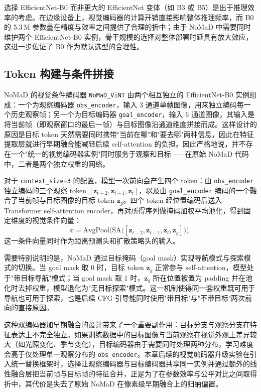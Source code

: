 选择 EfficientNet-B0 而非更大的 EfficientNet 变体（如 B3 或 B5）是出于推理效率的考虑。在边缘设备上，视觉编码器的计算开销直接影响整体推理频率，而 B0 的 5.3\,M 参数量在精度与效率之间提供了合理的折中；由于 NoMaD 中需要同时维护两个 EfficientNet-B0 实例，骨干规模的选择对整体部署时延具有放大效应，这进一步佐证了 B0 作为默认选型的合理性。

\subsection{Token 构建与条件拼接}

NoMaD 的视觉条件编码器 \texttt{NoMaD\_ViNT} 由两个相互独立的 EfficientNet-B0 实例组成：一个为观察编码器 \texttt{obs\_encoder}，输入 3 通道单帧图像，用来独立编码每一个历史观察帧；另一个为目标编码器 \texttt{goal\_encoder}，输入 6 通道图像，其输入是将当前帧（即观察窗口的最后一帧）与目标图像沿通道维度拼接而成。这样设计的原因是目标 token 天然需要同时携带"当前在哪"和"要去哪"两种信息，因此在特征提取层就进行早期融合能减轻后续 self-attention 的负担。因此严格地说，并不存在一个"统一的视觉编码器实例"同时服务于观察和目标——在原始 NoMaD 代码中，二者是两个独立权重的网络。

对于 \texttt{context\_size=3} 的配置，模型一次前向会产生四个 token：由 \texttt{obs\_encoder} 独立编码的三个观察 token $[\mathbf{z}_{t-2}, \mathbf{z}_{t-1}, \mathbf{z}_t]$，以及由 \texttt{goal\_encoder} 编码的一个融合了当前帧与目标图像的目标 token $\mathbf{z}_g$。四个 token 经位置编码后送入 Transformer self-attention encoder，再对所得序列做掩码加权平均池化，得到固定维度的视觉条件向量：
\begin{equation}
\mathbf{c} = \text{AvgPool}\bigl(\text{SA}\bigl([\mathbf{z}_{t-2}, \mathbf{z}_{t-1}, \mathbf{z}_t, \mathbf{z}_g]\bigr)\bigr).
\end{equation}
这一条件向量同时作为距离预测头和扩散策略头的输入。

需要特别说明的是，NoMaD 通过目标掩码（goal mask）实现导航模式与探索模式的切换。当 goal mask 取 0 时，目标 token $\mathbf{z}_g$ 正常参与 self-attention，模型处于"带目标导航"模式；当 goal mask 取 1 时，$\mathbf{z}_g$ 所在位置被置为 padding 并在池化时去掉权重，模型退化为"无目标探索"模式。这一机制使得同一套权重既可用于导航也可用于探索，也是后续 CFG 引导能同时使用"带目标"与"不带目标"两次前向的直接原因。

这种双编码器加早期融合的设计带来了一个重要副作用：目标分支与观察分支在特征表达上不完全独立。如果训练数据中的目标图像与当前观察在视觉外观上差异较大（如光照变化、季节变化），目标编码器由于需要同时处理两种分布，学习难度会高于仅处理单一观察分布的 \texttt{obs\_encoder}。本章后续的视觉编码器升级实验在引入统一替换框架时，选择让观察编码器与目标编码器共享同一实例并通过额外的线性融合层把当前帧与目标帧的特征合并，正是为了在参数效率与公平对比之间取得折中，其代价是失去了原始 NoMaD 在像素级早期融合上的归纳偏置。

